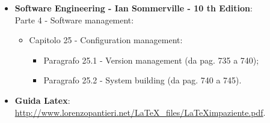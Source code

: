 \begin{itemize}
	\item \textbf{Software Engineering - Ian Sommerville - 10 th Edition}: \\
	Parte 4 - Software management:
	\begin{itemize}
		\item Capitolo 25 - Configuration management:
		\begin{itemize}
			\item Paragrafo 25.1 - Version management (da pag. 735 a 740);
			\item Paragrafo 25.2 - System building (da pag. 740 a 745).
		\end{itemize}
	\end{itemize}
		
	\item \textbf{Guida Latex}:\\ \textcolor{blue}{\url{http://www.lorenzopantieri.net/LaTeX_files/LaTeXimpaziente.pdf}}.
	
	
\end{itemize}

	

